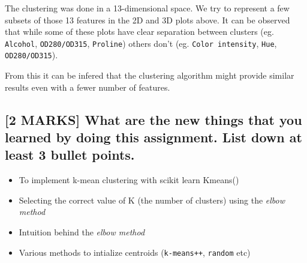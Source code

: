 \documentclass[11pt]{article}
\providecommand{\tightlist}{%
      \setlength{\itemsep}{0pt}\setlength{\parskip}{0pt}}
\begin{document}
    The clustering was done in a 13-dimensional space. We try to represent a
few subsets of those 13 features in the 2D and 3D plots above. It can be
observed that while some of these plots have clear separation between
clusters (eg. \texttt{Alcohol}, \texttt{OD280/OD315}, \texttt{Proline})
others don't (eg. \texttt{Color\ intensity}, \texttt{Hue},
\texttt{OD280/OD315}).

From this it can be infered that the clustering algorithm might provide
similar results even with a fewer number of features.

    \hypertarget{marks-what-are-the-new-things-that-you-learned-by-doing-this-assignment.-list-down-at-least-3-bullet-points.}{%
\subsection{{[}2 MARKS{]} What are the new things that you learned by
doing this assignment. List down at least 3 bullet
points.}\label{marks-what-are-the-new-things-that-you-learned-by-doing-this-assignment.-list-down-at-least-3-bullet-points.}}

\begin{itemize}
\tightlist
\item
  To implement k-mean clustering with scikit learn Kmeans()
\item
  Selecting the correct value of K (the number of clusters) using the
  \emph{elbow method}
\item
  Intuition behind the \emph{elbow method}
\item
  Various methods to intialize centroids (\texttt{k-means++},
  \texttt{random} etc)
\end{itemize}


    
    
    
\end{document}
